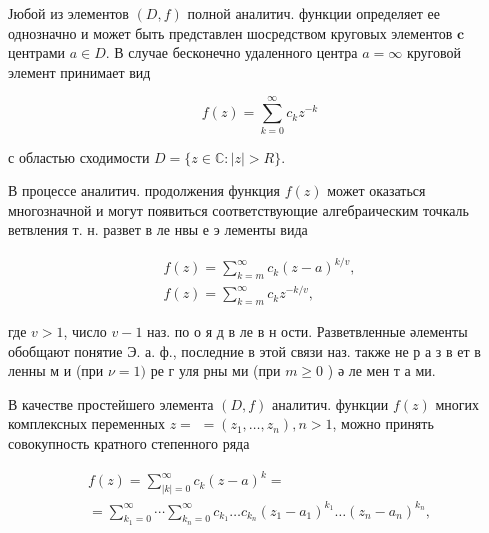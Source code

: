 \documentclass[10pt]{article}
\begin{document}
Јюбой из элементов $(D, f)$ полной аналитич. функции определяет ее однозначно и может быть представлен шосредством круговых элементов $\mathbf{c}$ центрами $a \in D$. В случае бесконечно удаленного центра $a=\infty$ круговой элемент принимает вид



\[

f(z)=\sum_{k=0}^{\infty} c_{k} z^{-k}

\]



с областью сходимости $D=\{z \in \mathbb{C}:|z|>R\}$.



В процессе аналитич. продолжения функция $f(z)$ может оказаться многозначной и могут появиться соответствующие алгебраическим точкаль ветвления т. н. развет в ле нвы е э лементы вида



\[

\begin{gathered}

f(z)=\sum_{k=m}^{\infty} c_{k}(z-a)^{k / v}, \\

f(z)=\sum_{k=m}^{\infty} c_{k} z^{-k / v},

\end{gathered}

\]



где $v>1$, число $v-1$ наз. по о я д в ле в н ости. Разветвленные әлементы обобщают понятие Э. а. ф., последние в этой связи наз. также не р а з в ет в ленны м и (при $\nu=1)$ ре г уля рны ми (при $m \geqslant 0$ ) ә ле мен т а ми.



В качестве простейшего элемента $(D, f)$ аналитич. функции $f(z)$ многих комплексных переменных $z=$ $=\left(z_{1}, \ldots, z_{n}\right), n>1$, можно принять совокупность кратного степенного ряда



\[

\begin{gathered}

f(z)=\sum_{|k|=0}^{\infty} c_{k}(z-a)^{k}= \\

=\sum_{k_{1}=0}^{\infty} \cdots \sum_{k_{n}=0}^{\infty} c_{k_{1}} \ldots c_{k_{n}}\left(z_{1}-a_{1}\right)^{k_{1}} \ldots\left(z_{n}-a_{n}\right)^{k_{n}},

\end{gathered}

\]
\end{document}
